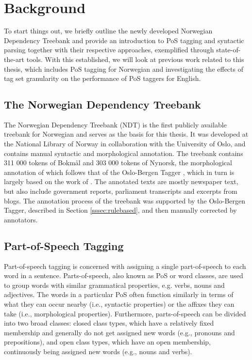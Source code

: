 \documentclass[a4paper,12pt,english]{book}
\begin{document}
\chapter{Background}
\label{chap:background}
To start things out, we briefly outline the newly developed Norwegian
Dependency Treebank and provide an introduction to PoS tagging and syntactic
parsing together with their respective approaches, exemplified through
state-of-the-art tools. With this established, we will look at previous work
related to this thesis, which includes PoS tagging for Norwegian and
investigating the effects of tag set granularity on the performance of PoS
taggers for English.

\section{The Norwegian Dependency Treebank}
The Norwegian Dependency Treebank (NDT) \cite{Sol:Skj:Ovr:14} is the first
publicly available treebank for Norwegian and serves as the basis for this
thesis. It was developed at the National Library of Norway in collaboration
with the University of Oslo, and contains manual syntactic and morphological
annotation. The treebank contains 311 000 tokens of Bokmål and 303 000 tokens
of Nynorsk, the morphological annotation of which follows that of the
Oslo-Bergen Tagger \cite{Hag:Joh:Nok:00, Sol:13}, which in turn is largely
based on the work of . The annotated texts are mostly
newspaper text, but also include government reports, parliament transcripts and
excerpts from blogs.  The annotation process of the treebank was supported by
the Oslo-Bergen Tagger, described in Section \ref{sssec:rulebased}, and then
manually corrected by annotators.

\section{Part-of-Speech Tagging}
Part-of-speech tagging is concerned with assigning a single part-of-speech to
each word in a sentence. Parts-of-speech, also known as PoS or word classes,
are used to group words with similar grammatical properties, e.g. verbs, nouns
and adjectives. The words in a particular PoS often function similarly in terms
of what they can occur nearby (i.e., syntactic properties) or the affixes they
can take (i.e., morphological properties). Furthermore, parts-of-speech can be
divided into two broad classes: closed class types, which have a relatively
fixed membership and generally do not get assigned new words (e.g., pronouns
and prepositions), and open class types, which have an open membership,
continuously being assigned new words (e.g., nouns and verbs).
\end{document}
